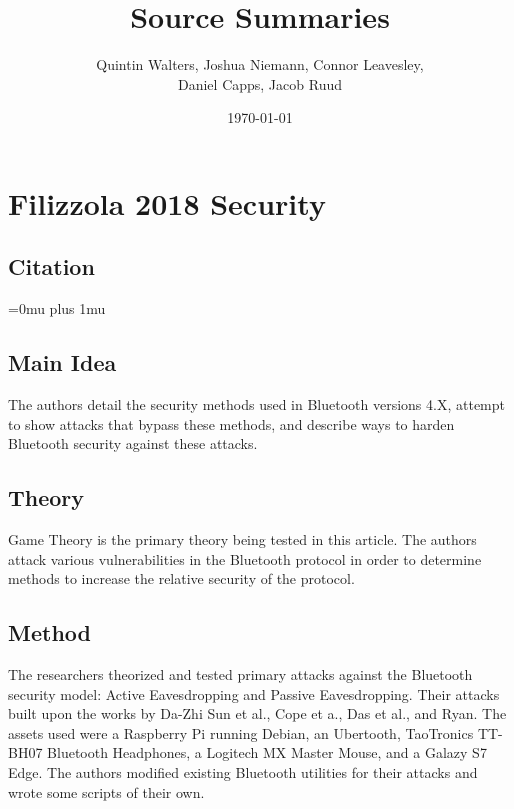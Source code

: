 \documentclass[a4paper,12pt]{article}
\begin{document}
	\nobibliography*
	
    \title{Source Summaries}
    \author{Quintin Walters, Joshua Niemann, Connor Leavesley,\\
    Daniel Capps, Jacob Ruud}
    \date{\today}
    \maketitle
\break
\tableofcontents
\break

\break
\noindent
\section{Filizzola 2018 Security}
\subsection{Citation}

\noindent


\noindent

\Urlmuskip=0mu plus 1mu\relax
{}


\subsection{Main Idea}

\noindent
The authors detail the security methods used in Bluetooth versions 4.X, attempt to show attacks that bypass these methods, and describe ways to harden Bluetooth security against these attacks.  

\subsection{Theory}

\noindent
Game Theory is the primary theory being tested in this article.  The authors attack various vulnerabilities in the Bluetooth protocol in order to determine methods to increase the relative security of the protocol.

\subsection{Method}

\noindent
The researchers theorized and tested primary attacks against the Bluetooth security model: Active Eavesdropping and Passive Eavesdropping.  Their attacks built upon the works by Da-Zhi Sun et al., Cope et a., Das et al., and Ryan.  The assets used were a Raspberry Pi running Debian, an Ubertooth, TaoTronics TT-BH07 Bluetooth Headphones, a Logitech MX Master Mouse, and a Galazy S7 Edge.  The authors modified existing Bluetooth utilities for their attacks and wrote some scripts of their own.
\end{document}
